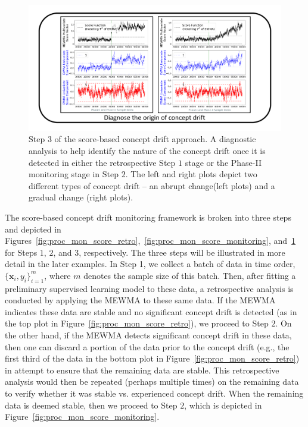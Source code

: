 \documentclass[twoside,11pt]{article}
\begin{document}
\begin{figure}
\centering
\includegraphics[width = 1\linewidth, trim=.35in .20in .35in .20in, clip]{../figures/v14/flow_chart/Diagnose_1.png}
\caption{Step $3$ of the score-based concept drift approach. A diagnostic analysis to help identify the nature of the concept drift once it is detected in either the retrospective Step $1$ stage or the Phase-II monitoring stage in Step $2$. The left and right plots depict two different types of concept drift -- an abrupt change(left plots) and a gradual change (right plots).}
\label{fig:proc_mon_score_diagnosis}
\end{figure}

The score-based concept drift monitoring framework is broken into three steps and depicted in Figures~\ref{fig:proc_mon_score_retro},~\ref{fig:proc_mon_score_monitoring}, and~\ref{fig:proc_mon_score_diagnosis} for Steps $1$, $2$, and $3$, respectively. The three steps will be illustrated in more detail in the later examples. In Step 1, we collect a batch of data in time order, $\{\bm {x}_i, y_i\} _{i=1} ^{m}$, where $m$ denotes the sample size of this batch. Then, after fitting a preliminary supervised learning model to these data, a retrospective analysis is conducted by applying the MEWMA to these same data. If the MEWMA indicates these data are stable and no significant concept drift is detected (as in the top plot in Figure~\ref{fig:proc_mon_score_retro}), we proceed to Step $2$. On the other hand, if the MEWMA detects significant concept drift in these data, then one can discard a portion of the data prior to the concept drift (e.g., the first third of the data in the bottom plot in Figure~\ref{fig:proc_mon_score_retro}) in attempt to ensure that the remaining data are stable. This retrospective analysis would then be repeated (perhaps multiple times) on the remaining data to verify whether it was stable vs. experienced concept drift. When the remaining data is deemed stable, then we proceed to Step $2$, which is depicted in Figure~\ref{fig:proc_mon_score_monitoring}.
\end{document}
